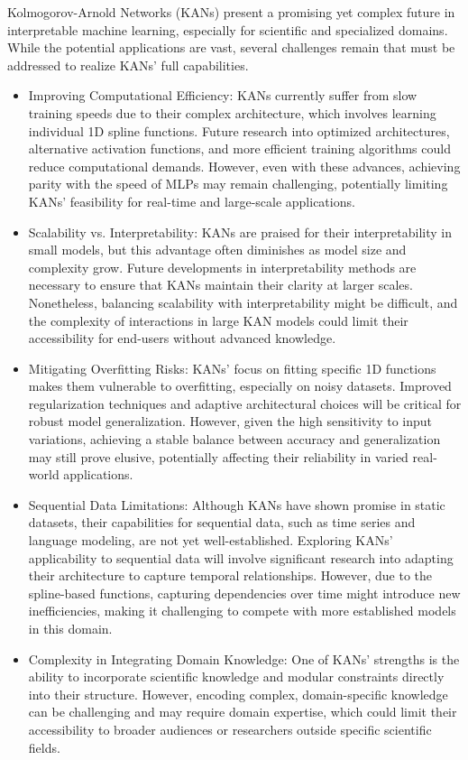 Kolmogorov-Arnold Networks (KANs) present a promising yet complex future in interpretable machine learning, especially for scientific and specialized domains. While the potential applications are vast, several challenges remain that must be addressed to realize KANs' full capabilities.
\begin{itemize} 
    \item Improving Computational Efficiency: KANs currently suffer from slow training speeds due to their complex architecture, which involves learning individual 1D spline functions. Future research into optimized architectures, alternative activation functions, and more efficient training algorithms could reduce computational demands. However, even with these advances, achieving parity with the speed of MLPs may remain challenging, potentially limiting KANs’ feasibility for real-time and large-scale applications.
    \item Scalability vs. Interpretability: KANs are praised for their interpretability in small models, but this advantage often diminishes as model size and complexity grow. Future developments in interpretability methods are necessary to ensure that KANs maintain their clarity at larger scales. Nonetheless, balancing scalability with interpretability might be difficult, and the complexity of interactions in large KAN models could limit their accessibility for end-users without advanced knowledge.
    \item Mitigating Overfitting Risks: KANs' focus on fitting specific 1D functions makes them vulnerable to overfitting, especially on noisy datasets. Improved regularization techniques and adaptive architectural choices will be critical for robust model generalization. However, given the high sensitivity to input variations, achieving a stable balance between accuracy and generalization may still prove elusive, potentially affecting their reliability in varied real-world applications.
    \item Sequential Data Limitations: Although KANs have shown promise in static datasets, their capabilities for sequential data, such as time series and language modeling, are not yet well-established. Exploring KANs' applicability to sequential data will involve significant research into adapting their architecture to capture temporal relationships. However, due to the spline-based functions, capturing dependencies over time might introduce new inefficiencies, making it challenging to compete with more established models in this domain.
    \item Complexity in Integrating Domain Knowledge: One of KANs’ strengths is the ability to incorporate scientific knowledge and modular constraints directly into their structure. However, encoding complex, domain-specific knowledge can be challenging and may require domain expertise, which could limit their accessibility to broader audiences or researchers outside specific scientific fields.

\end{itemize}

